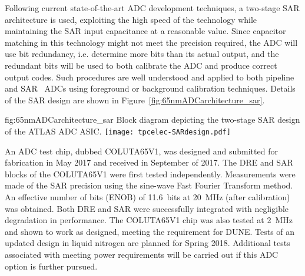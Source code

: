 Following current state-of-the-art ADC development techniques, a two-stage 
SAR architecture is used, exploiting the high speed of the technology while maintaining the SAR input 
capacitance at a reasonable value. Since capacitor matching in this technology might not meet the 
precision required, the ADC will use bit redundancy, i.e. determine more bits than its actual output, 
and the redundant bits will be used to both calibrate the ADC and produce correct output codes. 
Such procedures are well understood and applied to both pipeline~\cite{Kuppambatti:2013nfa} and 
SAR~\cite{5999734} ADCs using foreground or background calibration techniques. Details of the SAR design are shown in Figure~\ref{fig:65nmADCarchitecture_sar}. 

\begin{dunefigure}
{fig:65nmADCarchitecture_sar}
{Block diagram depicting the two-stage SAR design of the ATLAS ADC ASIC.}
\texttt{[image: tpcelec-SARdesign.pdf]}
\end{dunefigure}

An ADC test chip, dubbed COLUTA65V1, was designed and submitted for fabrication in May 2017 and received
in September of 2017.  The DRE and SAR blocks of the COLUTA65V1 were first tested independently. Measurements were made of the SAR precision using the sine-wave Fast Fourier Transform method. An effective number of bits
(ENOB) of \SI{11.6}{bits} at \SI{20}{MHz} (after calibration) was obtained.
Both DRE and SAR were successfully integrated with negligible degradation in performance. The COLUTA65V1 chip was also tested at 2~MHz and shown to work as designed, meeting the requirement for DUNE. Tests of an updated design in liquid nitrogen are planned for Spring 2018. Additional tests associated with meeting power requirements will be carried out if this ADC option is further pursued.
